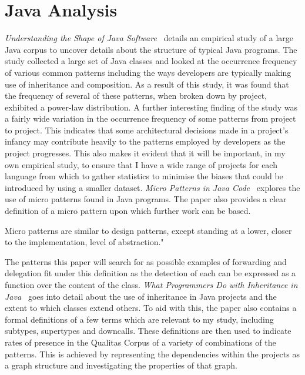 \section{Java Analysis}
\textit{Understanding the Shape of Java Software~\cite{ShapeOfJava}} details an empirical study of a large Java corpus to uncover details about the structure of typical Java programs. The study collected a large set of Java classes and looked at the occurrence frequency of various common patterns including the ways developers are typically making use of inheritance and composition. As a result of this study, it was found that the frequency of several of these patterns, when broken down by project, exhibited a power-law distribution. \newline
A further interesting finding of the study was a fairly wide variation in the occurrence frequency of some patterns from project to project. This indicates that some architectural decisions made in a project's infancy may contribute heavily to the patterns employed by developers as the project progresses. This also makes it evident that it will be important, in my own empirical study, to ensure that I have a wide range of projects for each language from which to gather statistics to minimise the biases that could be introduced by using a smaller dataset.
\newline
\newline
\textit{Micro Patterns in Java Code~\cite{JavaMicropatterns}} explores the use of micro patterns found in Java programs. The paper also provides a clear definition of a micro pattern upon which further work can be based.
\begin{displayquote}
	Micro patterns are similar to design patterns, except standing at a lower, closer to the implementation, level of abstraction."~\cite{JavaMicropatterns}
\end{displayquote}
The patterns this paper will search for as possible examples of forwarding and delegation fit under this definition as the detection of each can be expressed as a function over the content of the class.
\newline
\newline
\textit{What Programmers Do with Inheritance in Java~\cite{InheritanceInJava}} goes into detail about the use of inheritance in Java projects and the extent to which classes extend others. To aid with this, the paper also contains a formal definitions of a few terms which are relevant to my study, including subtypes, supertypes and downcalls. These definitions are then used to indicate rates of presence in the Qualitas Corpus of a variety of combinations of the patterns. This is achieved by representing the dependencies within the projects as a graph structure and investigating the properties of that graph.
